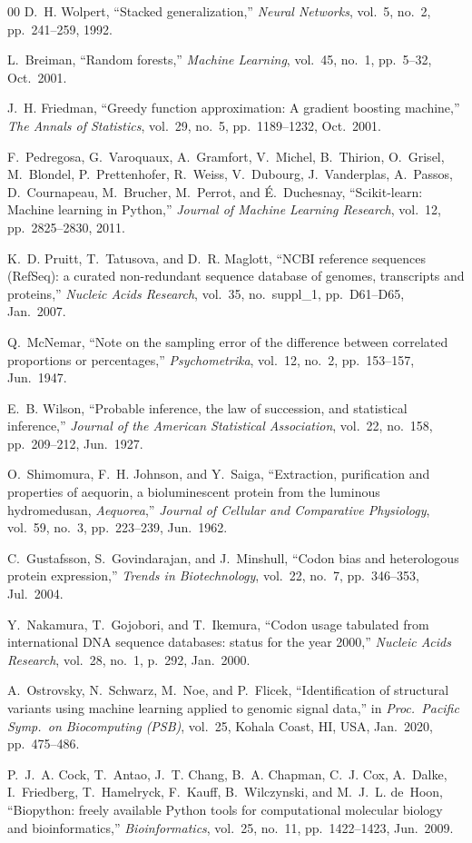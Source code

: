 \documentclass[conference]{IEEEtran}
\begin{document}
\begin{thebibliography}{00}
D.~H. Wolpert,
``Stacked generalization,''
\emph{Neural Networks}, vol.~5, no.~2, pp.~241--259, 1992.

L.~Breiman,
``Random forests,''
\emph{Machine Learning}, vol.~45, no.~1, pp.~5--32, Oct.\ 2001.

J.~H. Friedman,
``Greedy function approximation: A gradient boosting machine,''
\emph{The Annals of Statistics}, vol.~29, no.~5, pp.~1189--1232,
Oct.\ 2001.

F.~Pedregosa, G.~Varoquaux, A.~Gramfort, V.~Michel, B.~Thirion,
O.~Grisel, M.~Blondel, P.~Prettenhofer, R.~Weiss, V.~Dubourg,
J.~Vanderplas, A.~Passos, D.~Cournapeau, M.~Brucher, M.~Perrot,
and \'{E}.~Duchesnay,
``Scikit-learn: Machine learning in Python,''
\emph{Journal of Machine Learning Research}, vol.~12, pp.~2825--2830,
2011.

K.~D. Pruitt, T.~Tatusova, and D.~R. Maglott,
``NCBI reference sequences (RefSeq): a curated non-redundant sequence
database of genomes, transcripts and proteins,''
\emph{Nucleic Acids Research}, vol.~35, no.~suppl\_1, pp.~D61--D65,
Jan.\ 2007.

Q.~McNemar,
``Note on the sampling error of the difference between correlated
proportions or percentages,''
\emph{Psychometrika}, vol.~12, no.~2, pp.~153--157, Jun.\ 1947.

E.~B. Wilson,
``Probable inference, the law of succession, and statistical inference,''
\emph{Journal of the American Statistical Association}, vol.~22, no.~158,
pp.~209--212, Jun.\ 1927.

O.~Shimomura, F.~H. Johnson, and Y.~Saiga,
``Extraction, purification and properties of aequorin, a bioluminescent
protein from the luminous hydromedusan, \emph{Aequorea},''
\emph{Journal of Cellular and Comparative Physiology}, vol.~59, no.~3,
pp.~223--239, Jun.\ 1962.

C.~Gustafsson, S.~Govindarajan, and J.~Minshull,
``Codon bias and heterologous protein expression,''
\emph{Trends in Biotechnology}, vol.~22, no.~7, pp.~346--353, Jul.\ 2004.

Y.~Nakamura, T.~Gojobori, and T.~Ikemura,
``Codon usage tabulated from international DNA sequence databases:
status for the year 2000,''
\emph{Nucleic Acids Research}, vol.~28, no.~1, p.~292, Jan.\ 2000.

A.~Ostrovsky, N.~Schwarz, M.~Noe, and P.~Flicek,
``Identification of structural variants using machine learning
applied to genomic signal data,''
in \emph{Proc.\ Pacific Symp.\ on Biocomputing (PSB)}, vol.~25,
Kohala Coast, HI, USA, Jan.\ 2020, pp.~475--486.

P.~J.~A. Cock, T.~Antao, J.~T. Chang, B.~A. Chapman, C.~J. Cox,
A.~Dalke, I.~Friedberg, T.~Hamelryck, F.~Kauff, B.~Wilczynski,
and M.~J.~L. de~Hoon,
``Biopython: freely available Python tools for computational
molecular biology and bioinformatics,''
\emph{Bioinformatics}, vol.~25, no.~11, pp.~1422--1423, Jun.\ 2009.

\end{thebibliography}
\end{document}
